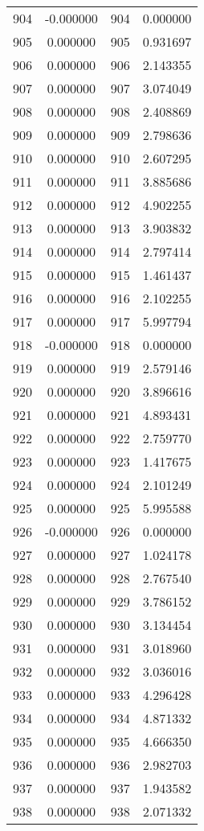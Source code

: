 \documentclass[12pt]{article}
\begin{document}
\begin{longtable}{@{}cccc@{}}
904 & -0.000000 & 904 & 0.000000 \\
905 & 0.000000 & 905 & 0.931697 \\
906 & 0.000000 & 906 & 2.143355 \\
907 & 0.000000 & 907 & 3.074049 \\
908 & 0.000000 & 908 & 2.408869 \\
909 & 0.000000 & 909 & 2.798636 \\
910 & 0.000000 & 910 & 2.607295 \\
911 & 0.000000 & 911 & 3.885686 \\
912 & 0.000000 & 912 & 4.902255 \\
913 & 0.000000 & 913 & 3.903832 \\
914 & 0.000000 & 914 & 2.797414 \\
915 & 0.000000 & 915 & 1.461437 \\
916 & 0.000000 & 916 & 2.102255 \\
917 & 0.000000 & 917 & 5.997794 \\
918 & -0.000000 & 918 & 0.000000 \\
919 & 0.000000 & 919 & 2.579146 \\
920 & 0.000000 & 920 & 3.896616 \\
921 & 0.000000 & 921 & 4.893431 \\
922 & 0.000000 & 922 & 2.759770 \\
923 & 0.000000 & 923 & 1.417675 \\
924 & 0.000000 & 924 & 2.101249 \\
925 & 0.000000 & 925 & 5.995588 \\
926 & -0.000000 & 926 & 0.000000 \\
927 & 0.000000 & 927 & 1.024178 \\
928 & 0.000000 & 928 & 2.767540 \\
929 & 0.000000 & 929 & 3.786152 \\
930 & 0.000000 & 930 & 3.134454 \\
931 & 0.000000 & 931 & 3.018960 \\
932 & 0.000000 & 932 & 3.036016 \\
933 & 0.000000 & 933 & 4.296428 \\
934 & 0.000000 & 934 & 4.871332 \\
935 & 0.000000 & 935 & 4.666350 \\
936 & 0.000000 & 936 & 2.982703 \\
937 & 0.000000 & 937 & 1.943582 \\
938 & 0.000000 & 938 & 2.071332 \\

\end{longtable}
\end{document}

